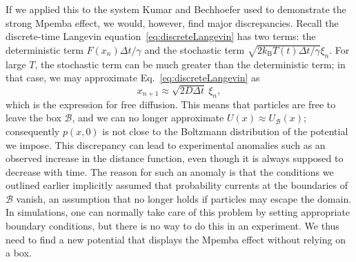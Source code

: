 \documentclass[hyperref={colorlinks=true, urlcolor=blue, citecolor=blue, final, bound}]{sfuthesis}
\newcommand{\kB}{k_{\mathrm{B}}}
\begin{document}
If we applied this to the system Kumar and Bechhoefer used to demonstrate the strong Mpemba effect, we would, however, find major discrepancies. Recall the discrete-time Langevin equation~\ref{eq:discreteLangevin} has two terms: the deterministic term $F(x_n)\Delta t/\gamma$ and the stochastic term $\sqrt{2\kB T(t)\Delta t/\gamma}\xi_n$. For large $T$, the stochastic term can be much greater than the deterministic term; in that case, we may approximate Eq.~\ref{eq:discreteLangevin} as 
\begin{equation}
    x_{n+1} \approx \sqrt{2D\Delta t}~\xi_n,
\end{equation}
which is the expression for free diffusion. This means that particles are free to leave the box $\mathcal B$, and we can no longer approximate $U(x) \approx U_{\mathcal B}(x)$; consequently $p(x,0)$ is not close to the Boltzmann distribution of the potential we impose. This discrepancy can lead to experimental anomalies such as an observed increase in the distance function, even though it is always supposed to decrease with time. The reason for such an anomaly is that the conditions we outlined earlier implicitly assumed that probability currents at the boundaries of $\mathcal B$ vanish, an assumption that no longer holds if particles may escape the domain. In simulations, one can normally take care of this problem by setting appropriate boundary conditions, but there is no way to do this in an experiment. We thus need to find a new potential that displays the Mpemba effect without relying on a box.
\end{document}
